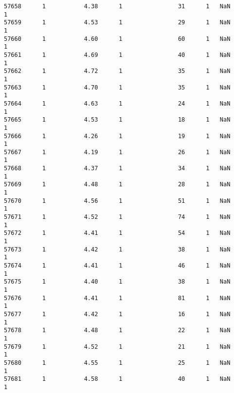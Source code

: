 \documentclass[a4paper,11pt,final]{article}
\begin{document}
\begin{Verbatim}[commandchars=\\\{\},frame=leftline,fontsize=\small, xleftmargin=0.5em]
57658      1           4.38      1                31      1   NaN
1
57659      1           4.53      1                29      1   NaN
1
57660      1           4.60      1                60      1   NaN
1
57661      1           4.69      1                40      1   NaN
1
57662      1           4.72      1                35      1   NaN
1
57663      1           4.70      1                35      1   NaN
1
57664      1           4.63      1                24      1   NaN
1
57665      1           4.53      1                18      1   NaN
1
57666      1           4.26      1                19      1   NaN
1
57667      1           4.19      1                26      1   NaN
1
57668      1           4.37      1                34      1   NaN
1
57669      1           4.48      1                28      1   NaN
1
57670      1           4.56      1                51      1   NaN
1
57671      1           4.52      1                74      1   NaN
1
57672      1           4.41      1                54      1   NaN
1
57673      1           4.42      1                38      1   NaN
1
57674      1           4.41      1                46      1   NaN
1
57675      1           4.40      1                38      1   NaN
1
57676      1           4.41      1                81      1   NaN
1
57677      1           4.42      1                16      1   NaN
1
57678      1           4.48      1                22      1   NaN
1
57679      1           4.52      1                21      1   NaN
1
57680      1           4.55      1                25      1   NaN
1
57681      1           4.58      1                40      1   NaN
1


\end{Verbatim}
\end{document}
